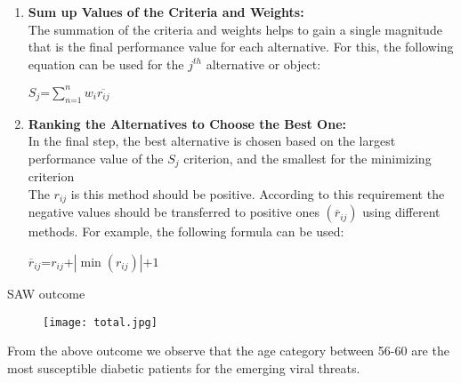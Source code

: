 \documentclass[serif, aspectratio=169]{beamer}
\newtheorem{thm co}{Theorem contd...}
\begin{document}
\begin{frame}
\begin{enumerate}

\item \textbf{Sum up Values of the Criteria and Weights:}\\
\hspace{1em}The summation of the criteria and weights helps
to gain a single magnitude that is the final performance value for each alternative. For this, the following equation can be used for the $j^{th}$ alternative or object:\\
\vspace{2mm}
\begin{center}
    $S_{j}\text{=}\sum\limits^{n}_{n\text{=}1}w_{i}\overline{r_{ij}}$
\end{center}
\vspace{3mm}
\item \textbf{Ranking the Alternatives to Choose the
Best One:}\\
\hspace{1em}In the final step, the best alternative is chosen
based on the largest performance value of the $S_{j}$ \maximizing criterion, and the smallest for the minimizing criterion\\
\vspace{3mm}
\hspace{1em}The $r_{ij}$ is this method should be positive. According to this requirement the negative values should be transferred to positive ones $(\overline r_{ij})$ using different methods. For example, the following formula can be used:\\
\begin{center}
   $\overline r_{ij} \text{=} r_{ij} $+$ |{\min (r_{ij})}|\text{+}1$
    
\end{center}
\vspace{2mm}
\end{enumerate}
\end{frame}

\begin{frame}{SAW outcome}

\begin{figure}
    \centering
    \texttt{[image: total.jpg]}

\end{figure}
  
  \hspace{1em} From the above outcome we observe that the age category between 56-60 are the most susceptible diabetic patients for the emerging viral threats. 
\end{frame}
\end{document}
